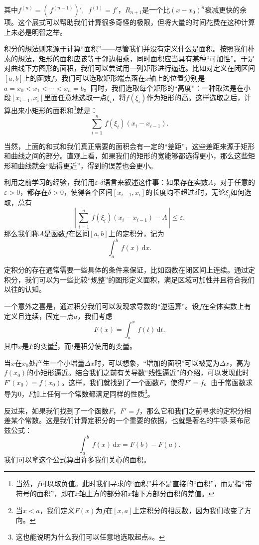 其中$f^{(n)}=\left(\, f^{(n-1)} \right)'$,~$\,f^{(1)}=f'$，$R_{n+1}$是一个比$(x-x_0)^n$衰减更快的余项。这个展式可以帮助我们计算很多奇怪的极限，但将大量的时间花费在这种计算上未必是明智之举。


积分的想法则来源于计算“面积”——尽管我们并没有定义什么是面积。按照我们朴素的想法，矩形的面积应该等于邻边相乘，同时面积应当具有某种“可加性”。于是对曲线下方图形的面积，我们可以尝试用一列矩形进行逼近。比如对定义在闭区间$[a,b]$上的函数$f$，我们可以选取矩形端点落在$x$轴上的位置分别是$a=x_0<x_1<\cdots  <x_n=b$。同时，我们选取每个矩形的“高度”：一种取法是在小段$[x_{i-1},x_{i}]$里面任意地选取一点$\xi_i$，将$f(\xi_i)$作为矩形的高。这样选取之后，计算出来小矩形的面积和\footnote{当然，$f$可以取负值。此时我们寻求的“面积”并不是直接的“面积”，而是指“带符号的面积”，即在$x$轴上方的部分和$x$轴下方部分面积的差值。}就是：
\[\sum_{i=1}^n  \,f(\xi_i)(x_i-x_{i-1}).\]

当然，上面的和式和我们真正需要的面积会有一定的“差距”，这些差距来源于矩形和曲线之间的部分。直观上看，如果我们的矩形的宽能够都选得更小，那么这些矩形和曲线就会“贴得更近”，得到的误差也会更小。

利用之前学习的经验，我们用$\varepsilon\text{-}\delta$语言来叙述这件事：如果存在实数$A$，对于任意的$\varepsilon>0$，都存在$\delta>0$，使得各个区间$[x_{i-1},x_i]$的长度均不超过$\delta$时，无论$\xi_i$如何选取，总有
\[\left|\,\sum_{i=1}^n  \,f(\xi_i)(x_i-x_{i-1})-A\,\right|\leq \varepsilon.\]
那么我们称$A$是函数$f$在区间$[a,b]$上的定积分，记为
\[\int_a^{b} \,f(x)\,\mathrm{d}x.\]

定积分的存在通常需要一些具体的条件来保证，比如函数在闭区间上连续。通过定积分，我们可以为一些比较“规整”的图形定义面积，满足区域可加性并且符合我们以往的认知。

一个意外之喜是，通过积分我们可以发现求导数的“逆运算”。设$f$在全体实数上有定义且连续，固定一点$a$，我们考虑
\[F(x)=\int_{a}^x\,f(t)\,\mathrm{d}t.\]
其中$x$是$F$的变量\footnote{当$x<a$，我们定义$F(x)$为$f$在$[x,a]$上定积分的相反数，因为我们改变了方向。}，而$t$是积分使用的变量。

当$x$在$x_0$处产生一个小增量$\Delta x$时，可以想象，“增加的面积”可以被宽为$\Delta x$，高为$f(x_0)$的小矩形逼近。结合我们之前有关导数“线性逼近”的介绍，可以发现此时$F'(x_0)=f(x_0)$。这样，我们就找到了一个函数$F$，使得$F'=f$。由于常函数求导为$0$，$F$加上任何一个常数都满足同样的性质\footnote{这也能说明为什么我们可以任意地选取起点$a$。}。

反过来，如果我们找到了一个函数$F$，$F'=f$，那么它和我们之前寻求的定积分相差某个常数。这是我们计算定积分的一个重要的依据，也就是著名的牛顿-莱布尼兹公式：
\[\int_a^b\,f(x)\,\mathrm{d}x=F(b)-F(a).\]
我们可以拿这个公式算出许多我们关心的面积。

